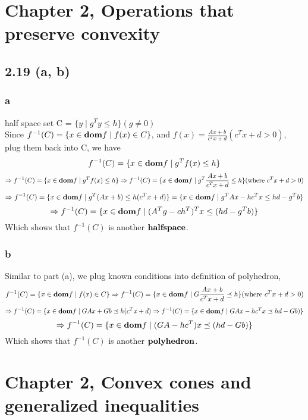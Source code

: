 \documentclass{article}
\newcommand{\dom}{{\mbox{\bf dom}}}
\begin{document}
\section*{Chapter 2, Operations that preserve convexity}

\subsection*{2.19 (a, b)}
\subsubsection*{a}
half space set C  =  $\{ y   \mid g^Ty \le h \} (g \ne 0)$\\
Since $f^{-1} (C)= \{ x \in \dom f \mid f(x) \in C\}$, and $f(x) = \frac{Ax +b}{c^Tx + d} (c^Tx + d > 0)$, plug them back into C, we have 
\[f^{-1} (C)= \{ x \in \dom f \mid g^Tf(x) \le h\}\]
\[ \Rightarrow f^{-1} (C)= \{ x \in \dom f \mid g^Tf(x) \le h\} \Rightarrow f^{-1} (C)= \{ x \in \dom f \mid g^T \frac{Ax +b}{c^Tx + d}  \le h\}  ( \mbox{where } c^Tx + d > 0) \]
\[\Rightarrow f^{-1} (C)= \{ x \in \dom f \mid g^T (Ax +b)   \le h( c^Tx + d)\} = \{ x \in \dom f \mid g^TAx  - h c^Tx    \le hd - g^Tb\} \]
\[ \Rightarrow  f^{-1} (C)= \{ x \in \dom f \mid (A^Tg - ch^T)^Tx    \le (hd - g^Tb) \} \]
Which shows that $f^{-1} (C)$ is another $\bf{halfspace}$.
\subsubsection*{b}
Similar to part (a), we plug known conditions into definition of polyhedron,
\[f^{-1} (C)= \{ x \in \dom f \mid f(x) \in C\} \Rightarrow f^{-1}(C)= \{ x \in \dom f \mid G\frac{Ax +b}{c^Tx + d}  \preceq h  \} ( \mbox{where } c^Tx + d > 0) \]
\[\Rightarrow f^{-1}(C)= \{ x \in \dom f \mid GAx +G b \preceq h(c^Tx + d)   \Rightarrow f^{-1}(C)= \{ x \in \dom f \mid GAx - h c^Tx \preceq   hd -G b) \} \]
\[ \Rightarrow f^{-1}(C)= \{ x \in \dom f \mid (GA - h c^T)x \preceq   (hd -Gb) \} \]
Which shows that $f^{-1} (C)$ is another $\bf{polyhedron}$.

\section*{Chapter 2, Convex cones and generalized inequalities}
\end{document}
